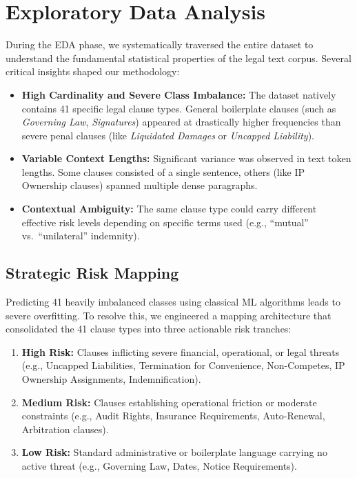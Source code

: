 \documentclass[12pt,a4paper]{article}
\begin{document}
\section{Exploratory Data Analysis}
\label{sec:eda}

During the EDA phase, we systematically traversed the entire dataset to understand
the fundamental statistical properties of the legal text corpus. Several critical
insights shaped our methodology:

\begin{itemize}[leftmargin=1.5cm]
    \item \textbf{High Cardinality and Severe Class Imbalance:} The dataset natively
    contains 41 specific legal clause types. General boilerplate clauses (such as
    \textit{Governing Law}, \textit{Signatures}) appeared at drastically higher
    frequencies than severe penal clauses (like \textit{Liquidated Damages} or
    \textit{Uncapped Liability}).

    \item \textbf{Variable Context Lengths:} Significant variance was observed in
    text token lengths. Some clauses consisted of a single sentence, others (like IP
    Ownership clauses) spanned multiple dense paragraphs.

    \item \textbf{Contextual Ambiguity:} The same clause type could carry different
    effective risk levels depending on specific terms used (e.g., ``mutual'' vs.\
    ``unilateral'' indemnity).
\end{itemize}

\subsection*{Strategic Risk Mapping}

Predicting 41 heavily imbalanced classes using classical ML algorithms leads to
severe overfitting. To resolve this, we engineered a mapping architecture that
consolidated the 41 clause types into three actionable risk tranches:

\begin{enumerate}
    \item \textbf{High Risk:} Clauses inflicting severe financial, operational, or
    legal threats (e.g., Uncapped Liabilities, Termination for Convenience,
    Non-Competes, IP Ownership Assignments, Indemnification).

    \item \textbf{Medium Risk:} Clauses establishing operational friction or moderate
    constraints (e.g., Audit Rights, Insurance Requirements, Auto-Renewal,
    Arbitration clauses).

    \item \textbf{Low Risk:} Standard administrative or boilerplate language carrying
    no active threat (e.g., Governing Law, Dates, Notice Requirements).
\end{enumerate}
\end{document}
